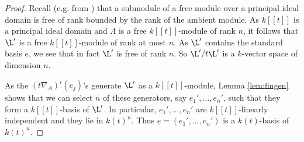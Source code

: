 \documentclass[a4paper, 11pt]{article}
\begin{document}
\begin{proof}
	Recall (e.g. from \cite[Chapter III, Theorem 7.1]{Lang:Algebra}) that a submodule of a free module over a principal ideal domain is free of rank bounded by the rank of the ambient module. As $k[[t]]$ is a principal ideal domain and $\Lambda$ is a free $k[[t]]$-module of rank $n$, it follows that $\L'$ is a free $k[[t]]$-module of rank at most $n$.
	As $\L'$ contains the standard basis $\underline{e}$, we see that in fact $\L'$ is free of rank $n$.
	So $\L'/t\L'$ is a $k$-vector space of dimension $n$.
	
	As the $(t\nabla_A)^i(e_j)$'s generate $\L'$ as a $k[[t]]$-module, Lemma \ref{lem:fingen} shows that we can select $n$ of these generators, say $e_1',\ldots,e_n'$, such that they form a $k[[t]]$-basis of $\L'$. In particular,  $e_1',\ldots,e_n'$ are $k[[t]]$-linearly independent and they lie in $k(t)^n$. Thus $\underline{e}=(e_1',\ldots,e_n')$ is a $k(t)$-basis of $k(t)^n$. 


\end{proof}
\end{document}
